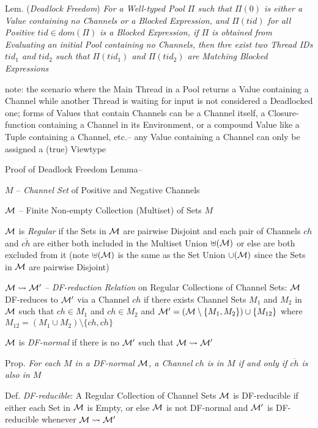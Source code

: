 Lem. (\emph{Deadlock Freedom}) \emph{For a Well-typed Pool $\Pi$ such
  that $\Pi(0)$ is either a Value containing no Channels or a Blocked
  Expression, and $\Pi(tid)$ for all Positive $tid \in dom(\Pi)$ is a
  Blocked Expression, if $\Pi$ is obtained from Evaluating an initial
  Pool containing no Channels, then thre exist two Thread IDs $tid_1$
  and $tid_2$ such that $\Pi(tid_1)$ and $\Pi(tid_2)$ are Matching
  Blocked Expressions}

note: the scenario where the Main Thread in a Pool returns a Value
containing a Channel while another Thread is waiting for input is not
considered a Deadlocked one; forms of Values that contain Channels can
be a Channel itself, a Closure-function containing a Channel in its
Environment, or a compound Value like a Tuple containing a Channel,
etc.-- any Value containing a Channel can only be assigned a (true)
Viewtype

Proof of Deadlock Freedom Lemma--

$M$ -- \emph{Channel Set} of Positive and Negative Channels

$\mathcal{M}$ -- Finite Non-empty Collection (Multiset) of Sets $M$

$\mathcal{M}$ is \emph{Regular} if the Sets in $\mathcal{M}$ are pairwise
Disjoint and each pair of Channels $ch$ and $\overline{ch}$ are either
both included in the Multiset Union $\uplus(\mathcal{M})$ or else are
both excluded from it (note $\uplus(\mathcal{M})$ is the same as the Set
Union $\cup(\mathcal{M})$ since the Sets in $\mathcal{M}$ are pairwise
Disjoint)

$\mathcal{M} \rightsquigarrow \mathcal{M}'$ -- \emph{DF-reduction
  Relation} on Regular Collections of Channel Sets: $\mathcal{M}$
DF-reduces to $\mathcal{M}'$ via a Channel $ch$ if there exists Channel
Sets $M_1$ and $M_2$ in $\mathcal{M}$ such that $ch \in M_1$ and $ch \in
M_2$ and $\mathcal{M}' = (\mathcal{M}\setminus\{M_1,M_2\}) \cup
\{M_{12}\}$ where $M_{12} = (M_1 \cup
M_2)\setminus\{ch,\overline{ch}\}$

$\mathcal{M}$ is \emph{DF-normal} if there is no $\mathcal{M}'$ such that
$\mathcal{M} \rightsquigarrow \mathcal{M}'$

Prop. \emph{For each $M$ in a DF-normal $\mathcal{M}$, a Channel $ch$ is
  in $M$ if and only if $\overline{ch}$ is also in $M$}

Def. \emph{DF-reducible}: A Regular Collection of Channel Sets
$\mathcal{M}$ is DF-reducible if either each Set in $\mathcal{M}$ is
Empty, or else $\mathcal{M}$ is not DF-normal and $\mathcal{M}'$ is
DF-reducible whenever $\mathcal{M} \rightsquigarrow \mathcal{M}'$

